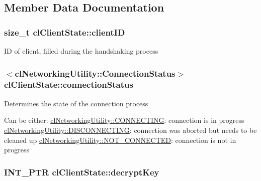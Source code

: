 \subsection{Member Data Documentation}
\hypertarget{classcl_client_state_a4153db8a239f862cbd61bf8e75e25794}{
\subsubsection[{clientID}]{\setlength{\rightskip}{0pt plus 5cm}size\_\-t {\bf clClientState::clientID}}}
\label{classcl_client_state_a4153db8a239f862cbd61bf8e75e25794}
ID of client, filled during the handshaking process \hypertarget{classcl_client_state_a97b10049b464fb11544d22bdb03ada4f}{
\subsubsection[{connectionStatus}]{$<${\bf clNetworkingUtility::ConnectionStatus}$>$ {\bf clClientState::connectionStatus}}}
\label{classcl_client_state_a97b10049b464fb11544d22bdb03ada4f}
Determines the state of the connection process \par
 Can be either: \hyperlink{classcl_networking_utility_a15dd34683154e07d5843f8f5432fec6dabf4d0d3d12524780c743ee1262fbc278}{clNetworkingUtility::CONNECTING}: connection is in progress \hyperlink{classcl_networking_utility_a15dd34683154e07d5843f8f5432fec6dafad5daa966b363b76ea786a199121a28}{clNetworkingUtility::DISCONNECTING}: connection was aborted but needs to be cleaned up \hyperlink{classcl_networking_utility_a15dd34683154e07d5843f8f5432fec6da7ea7f5aa34e94ec65b905c2a37610583}{clNetworkingUtility::NOT\_\-CONNECTED}: connection is not in progress \hypertarget{classcl_client_state_ab8feb66a89295b2ee744245aad8e86ba}{
\subsubsection[{decryptKey}]{\setlength{\rightskip}{0pt plus 5cm}INT\_\-PTR {\bf clClientState::decryptKey}}}
